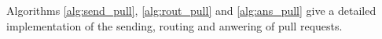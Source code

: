 Algorithms \ref{alg:send_pull}, \ref{alg:rout_pull} and \ref{alg:ans_pull} give a detailed implementation of the sending, routing and anwering of pull requests.










